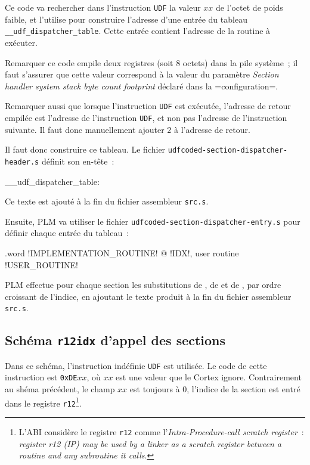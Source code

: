 Ce code va rechercher dans l'instruction \texttt{UDF} la valeur $xx$ de l'octet de poids faible, et l'utilise pour construire l'adresse d'une entrée du tableau \texttt{\_\_udf\_dispatcher\_table}. Cette entrée contient l'adresse de la routine à exécuter.

Remarquer ce code empile deux registres (soit 8 octets) dans la pile système~; il faut s'assurer que cette valeur correspond à la valeur du paramètre \emph{Section handler system stack byte count footprint} déclaré dans la \plm=configuration=.

Remarquer aussi que lorsque l'instruction \texttt{UDF} est exécutée, l'adresse de retour empilée est l'adresse de l'instruction \texttt{UDF}, et non pas l'adresse de l'instruction suivante. Il faut donc manuellement ajouter $2$ à l'adresse de retour.

Il faut donc construire ce tableau. Le fichier \texttt{udfcoded-section-dispatcher-header.s} définit son en-tête~:

\begin{SHELL}\small
\_\_udf\_dispatcher\_table:
\end{SHELL}

Ce texte est ajouté à la fin du fichier assembleur \texttt{src.s}.

Ensuite, PLM va utiliser le fichier \texttt{udfcoded-section-dispatcher-entry.s} pour définir chaque entrée du tableau~:
\begin{SHELL}\small
\hspace*{1.2em}.word !IMPLEMENTATION\_ROUTINE! @ !IDX!, user routine !USER\_ROUTINE!

\end{SHELL}

PLM effectue pour chaque section les substitutions de , de  et de , par ordre croissant de l'indice, en ajoutant le texte produit à la fin du fichier assembleur \texttt{src.s}.










\subsection{Schéma \texttt{r12idx} d'appel des sections}

Dans ce schéma, l'instruction indéfinie \texttt{UDF} est utilisée.  Le code de cette instruction est \texttt{0xDE$xx$}, où $xx$ est une valeur que le Cortex ignore. Contrairement au shéma précédent, le champ $xx$ est toujours à $0$, l'indice de la section est entré dans le registre \texttt{r12}\footnote{L'ABI considère le registre \texttt{r12} comme l'\emph{Intra-Procedure-call scratch register}~: \emph{register r12 (IP) may be used by a linker as a scratch register between a routine and any subroutine it calls}.}.

